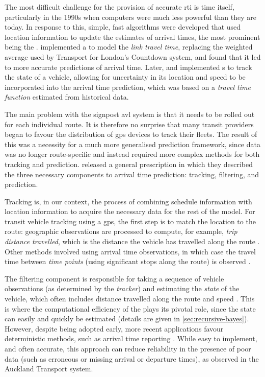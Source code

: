 The most difficult challenge for the provision of accurate \gls{rti} is time itself, particularly in the 1990s when computers were much less powerful than they are today. In response to this, simple, fast algorithms were developed that used \rt{} location information to update the estimates of arrival times, the most prominent being the \kf{}. \citet{Reinhoudt_1997} implemented a \kf{} to model the \emph{link travel time}, replacing the weighted average used by Transport for London's Countdown system, and found that it led to more accurate predictions of arrival time. Later, \citet{Wall_1999} and \citet{Dailey_2001} implemented \kf{}s to track the state of a vehicle, allowing for uncertainty in its location and speed to be incorporated into the arrival time prediction, which was based on a \emph{travel time function} estimated from historical data.



The main problem with the signpost \gls{avl} system is that it needs to be rolled out for each individual route. It is therefore no surprise that many transit providers began to favour the distribution of \gls{gps} devices to track their fleets. The result of this was a necessity for a much more generalised prediction framework, since data was no longer route-specific and instead required more complex methods for both tracking and prediction. \citet{Cathey_2003} released a general prescription in which they described the three necessary components to arrival time prediction: tracking, filtering, and prediction.


Tracking is, in our context, the process of combining schedule information with \rt{} location information to acquire the necessary data for the rest of the model. For transit vehicle tracking using a \gls{gps}, the first step is to match the location to the route: geographic observations are processed to compute, for example, \emph{trip distance travelled}, which is the distance the vehicle has travelled along the route \citep{Cathey_2003,Gong_2013}. Other methods involved using arrival time observations, in which case the travel time between \emph{time points} (using significant stops along the route) is observed \citep{Shalaby_2004,Jeong_2005,Yu_2011}.


The filtering component is responsible for taking a sequence of vehicle observations (as determined by the \emph{tracker}) and estimating the \emph{state} of the vehicle, which often includes distance travelled along the route and speed \citep{Dailey_2001,Cathey_2003}. This is where the computational efficiency of the \kf{} plays its pivotal role, since the state can easily and quickly be estimated (details are given in \cref{sec:recursive-bayes}). However, despite being adopted early, more recent applications favour deterministic methods, such as arrival time reporting \citep{Yin_2017,Cats_2015,Cats_2016}. While easy to implement, and often accurate, this approach can reduce reliability in the presence of poor data (such as erroneous or missing arrival or departure times), as observed in the Auckland Transport system.


